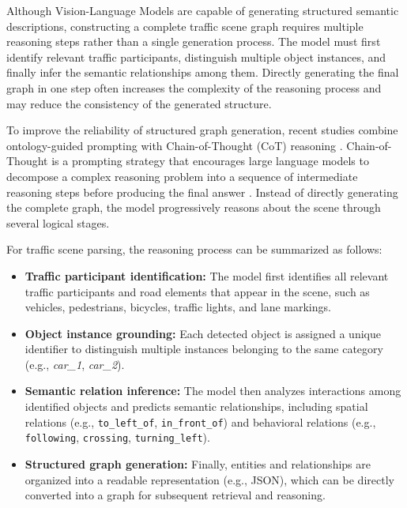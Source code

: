 \documentclass[a4paper, 11pt]{article} %
\begin{document}
Although Vision-Language Models are capable of generating structured semantic descriptions, constructing a complete traffic scene graph requires multiple reasoning steps rather than a single generation process. The model must first identify relevant traffic participants, distinguish multiple object instances, and finally infer the semantic relationships among them. Directly generating the final graph in one step often increases the complexity of the reasoning process and may reduce the consistency of the generated structure.

To improve the reliability of structured graph generation, recent studies combine ontology-guided prompting with Chain-of-Thought (CoT) reasoning \cite{wei2022chain,tian2025query}. Chain-of-Thought is a prompting strategy that encourages large language models to decompose a complex reasoning problem into a sequence of intermediate reasoning steps before producing the final answer \cite{wei2022chain}. Instead of directly generating the complete graph, the model progressively reasons about the scene through several logical stages.

For traffic scene parsing, the reasoning process can be summarized as follows:

\begin{itemize}
    \item \textbf{Traffic participant identification:} The model first identifies all relevant traffic participants and road elements that appear in the scene, such as vehicles, pedestrians, bicycles, traffic lights, and lane markings.

    \item \textbf{Object instance grounding:} Each detected object is assigned a unique identifier to distinguish multiple instances belonging to the same category (e.g., \textit{car\_1}, \textit{car\_2}).

    \item \textbf{Semantic relation inference:} The model then analyzes interactions among identified objects and predicts semantic relationships, including spatial relations (e.g., \texttt{to\_left\_of}, \texttt{in\_front\_of}) and behavioral relations (e.g., \texttt{following}, \texttt{crossing}, \texttt{turning\_left}).

    \item \textbf{Structured graph generation:} Finally, entities and relationships are organized into a readable representation (e.g., JSON), which can be directly converted into a graph for subsequent retrieval and reasoning.
\end{itemize}
\end{document}

